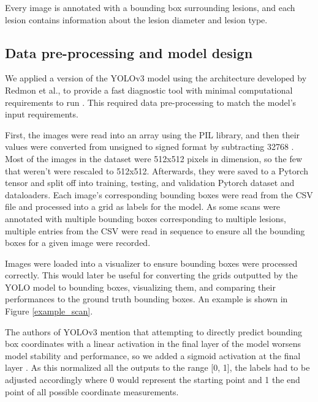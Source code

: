 Every image is annotated with a bounding box surrounding lesions, and each lesion contains information about the lesion diameter and lesion type. 

\subsection{Data pre-processing and model design}
We applied a version of the YOLOv3 model using the architecture developed by Redmon et al., to provide a fast diagnostic tool with minimal computational requirements to run \cite{yolov3}. This required data pre-processing to match the model's input requirements.

First, the images were read into an array using the PIL library, and then their values were converted from unsigned to signed format by subtracting 32768 \cite{deeplesion}. Most of the images in the dataset were 512x512 pixels in dimension, so the few that weren't were rescaled to 512x512. Afterwards, they were saved to a Pytorch tensor and split off into training, testing, and validation Pytorch dataset and dataloaders. Each image's corresponding bounding boxes were read from the CSV file and processed into a grid as labels for the model. As some scans were annotated with multiple bounding boxes corresponding to multiple lesions, multiple entries from the CSV were read in sequence to ensure all the bounding boxes for a given image were recorded.

Images were loaded into a visualizer to ensure bounding boxes were processed correctly. This would later be useful for converting the grids outputted by the YOLO model to bounding boxes, visualizing them, and comparing their performances to the ground truth bounding boxes. An example is shown in Figure \ref{example_scan}. 

The authors of YOLOv3 mention that attempting to directly predict bounding box coordinates with a linear activation in the final layer of the model worsens model stability and performance, so we added a sigmoid activation at the final layer \cite{yolov3}. As this normalized all the outputs to the range [0, 1], the labels had to be adjusted accordingly where 0 would represent the starting point and 1 the end point of all possible coordinate measurements.


